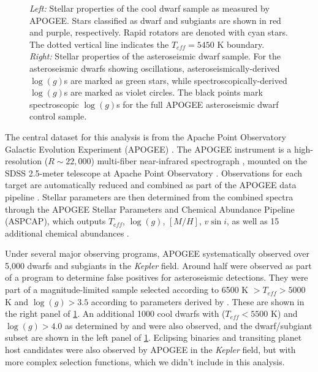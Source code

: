 \documentclass[manuscript]{aastex6}
\newcommand{\vsini}{\ensuremath{v \sin i}}
\newcommand{\Kepler}{\mbox{\textit{Kepler}}}
\newcommand{\Teff}{\ensuremath{T_{eff}}}
\newcommand{\logg}{\ensuremath{\log(g)}}
\begin{document}
\begin{figure}
    \caption{\emph{Left:} Stellar properties of the cool dwarf sample as
        measured by APOGEE\@. Stars classified as dwarf and subgiants are 
        shown in red and purple, respectively. Rapid rotators are denoted with 
        cyan stars. The dotted vertical line indicates the \(\Teff = 5450\) K
        boundary.
        \emph{Right:} Stellar properties of the asteroseismic dwarf sample. 
        For the asteroseismic dwarfs showing oscillations, 
        asteroseismically-derived \logg{}s are marked as green stars, while 
        spectroscopically-derived \logg{}s are marked as violet circles. The 
        black points mark spectroscopic \logg{}s for the full APOGEE
        asteroseismic dwarf control sample. \label{fig:sample}}
\end{figure}


The central dataset for this analysis is from the Apache Point Observatory 
Galactic Evolution Experiment (APOGEE) \citep{Blanton17,Majewski17}. The
APOGEE instrument is a high-resolution (\(R \sim 22,000\)) multi-fiber 
near-infrared spectrograph \citep{Wilson10}, mounted on the SDSS 2.5-meter 
telescope at Apache Point Observatory \citep{Gunn06}. Observations for each
target are automatically reduced and combined as part of the APOGEE data 
pipeline \citep{Nidever15}. Stellar parameters are then determined from the 
combined spectra through the APOGEE Stellar Parameters and Chemical Abundance 
Pipeline (ASPCAP), which outputs \Teff{}, \logg{}, \([M/H]\), \vsini{}, as 
well as 15 additional chemical abundances \citep{GarciaPerez16}.

Under several major observing programs, APOGEE systematically observed over 
5,000 dwarfs and subgiants in the \Kepler{} field. Around half were
observed as part of a program to determine false positives for
asteroseismic detections. They were part of a magnitude-limited sample
selected according to 6500 K \(> \Teff > 5000\) K and \(\logg > 3.5\)
according to parameters derived by \citet{Huber14} \citep{Zasowski17}. These
are shown in the right panel of \cref{fig:sample}. An additional 1000 cool 
dwarfs with (\(\Teff < 5500\) K) and \(\logg > 4.0\) as determined
by \citet{Pinsonneault12} and \citet{Brown11} were also observed, and the
dwarf/subgiant subset are shown in the left panel of \cref{fig:sample}. 
Eclipsing binaries and transiting planet host candidates were also observed 
by APOGEE in the \Kepler{} field, but with more complex selection functions, 
which we didn't include in this analysis.
\end{document}

